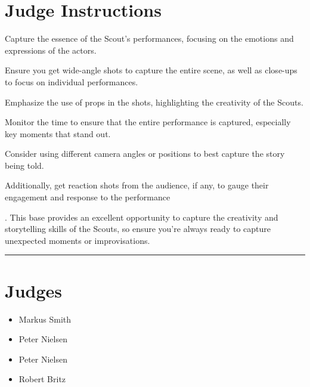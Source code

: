 \documentclass[10pt]{article}
\begin{document}
		\section*{Judge Instructions}
		Capture the essence of the Scout's performances, focusing on the emotions and expressions of the actors. 

Ensure you get wide-angle shots to capture the entire scene, as well as close-ups to focus on individual performances. 

Emphasize the use of props in the shots, highlighting the creativity of the Scouts. 

Monitor the time to ensure that the entire performance is captured, especially key moments that stand out. 

Consider using different camera angles or positions to best capture the story being told. 

Additionally, get reaction shots from the audience, if any, to gauge their engagement and response to the performance

. This base provides an excellent opportunity to capture the creativity and storytelling skills of the Scouts, so ensure you're always ready to capture unexpected moments or improvisations.


\vspace{0.5cm}
	\hrule
	\vspace{0.5cm}
		\section*{\faUsers \: Judges}

		

	\begin{multicols}{2}

		\begin{itemize}
									\item Markus Smith
									\item Peter Nielsen
						\end{itemize}

		\vfill\null
		\columnbreak

		\begin{itemize}
									\item Peter Nielsen
									\item Robert Britz
						\end{itemize}

		\vfill\null

		\end{multicols}
\end{document}
